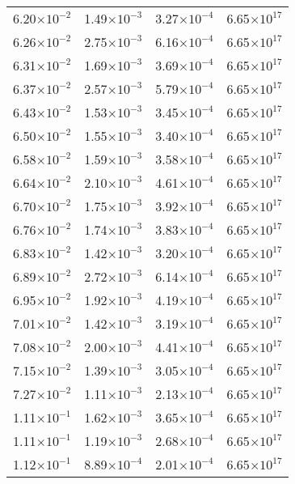 \documentclass{aa}
\begin{document}
{\begin{longtable}{c|c|c|c}
6.20$\times 10^{-2}$ & 1.49$\times 10^{-3}$ & 3.27$\times 10^{-4}$ & 6.65$\times 10^{17}$  \\
6.26$\times 10^{-2}$ & 2.75$\times 10^{-3}$ & 6.16$\times 10^{-4}$ & 6.65$\times 10^{17}$  \\
6.31$\times 10^{-2}$ & 1.69$\times 10^{-3}$ & 3.69$\times 10^{-4}$ & 6.65$\times 10^{17}$  \\
6.37$\times 10^{-2}$ & 2.57$\times 10^{-3}$ & 5.79$\times 10^{-4}$ & 6.65$\times 10^{17}$  \\
6.43$\times 10^{-2}$ & 1.53$\times 10^{-3}$ & 3.45$\times 10^{-4}$ & 6.65$\times 10^{17}$  \\
6.50$\times 10^{-2}$ & 1.55$\times 10^{-3}$ & 3.40$\times 10^{-4}$ & 6.65$\times 10^{17}$  \\
6.58$\times 10^{-2}$ & 1.59$\times 10^{-3}$ & 3.58$\times 10^{-4}$ & 6.65$\times 10^{17}$  \\
6.64$\times 10^{-2}$ & 2.10$\times 10^{-3}$ & 4.61$\times 10^{-4}$ & 6.65$\times 10^{17}$  \\
6.70$\times 10^{-2}$ & 1.75$\times 10^{-3}$ & 3.92$\times 10^{-4}$ & 6.65$\times 10^{17}$  \\
6.76$\times 10^{-2}$ & 1.74$\times 10^{-3}$ & 3.83$\times 10^{-4}$ & 6.65$\times 10^{17}$  \\
6.83$\times 10^{-2}$ & 1.42$\times 10^{-3}$ & 3.20$\times 10^{-4}$ & 6.65$\times 10^{17}$  \\
6.89$\times 10^{-2}$ & 2.72$\times 10^{-3}$ & 6.14$\times 10^{-4}$ & 6.65$\times 10^{17}$  \\
6.95$\times 10^{-2}$ & 1.92$\times 10^{-3}$ & 4.19$\times 10^{-4}$ & 6.65$\times 10^{17}$  \\
7.01$\times 10^{-2}$ & 1.42$\times 10^{-3}$ & 3.19$\times 10^{-4}$ & 6.65$\times 10^{17}$  \\
7.08$\times 10^{-2}$ & 2.00$\times 10^{-3}$ & 4.41$\times 10^{-4}$ & 6.65$\times 10^{17}$  \\
7.15$\times 10^{-2}$ & 1.39$\times 10^{-3}$ & 3.05$\times 10^{-4}$ & 6.65$\times 10^{17}$  \\
7.27$\times 10^{-2}$ & 1.11$\times 10^{-3}$ & 2.13$\times 10^{-4}$ & 6.65$\times 10^{17}$  \\
1.11$\times 10^{-1}$ & 1.62$\times 10^{-3}$ & 3.65$\times 10^{-4}$ & 6.65$\times 10^{17}$  \\
1.11$\times 10^{-1}$ & 1.19$\times 10^{-3}$ & 2.68$\times 10^{-4}$ & 6.65$\times 10^{17}$  \\
1.12$\times 10^{-1}$ & 8.89$\times 10^{-4}$ & 2.01$\times 10^{-4}$ & 6.65$\times 10^{17}$  \\

\end{longtable}}
\end{document}

